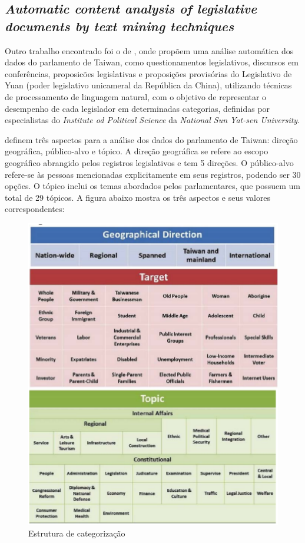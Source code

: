 \subsection{\textit{Automatic content analysis of legislative documents by text mining techniques}}

Outro trabalho encontrado foi o de , onde propõem uma análise automática dos dados do parlamento de Taiwan, como questionamentos legislativos, discursos em conferências, proposicões legislativas e proposições provisórias do Legislativo de Yuan (poder legislativo unicameral da República da China), utilizando técnicas de processamento de linguagem natural, com o objetivo de representar o desempenho de cada legislador em determinadas categorias, definidas por especialistas do \textit{Institute od Political Science} da \textit{National Sun Yat-sen University}.

 definem três aspectos para a análise dos dados do parlamento de Taiwan: direção geográfica, público-alvo e tópico. A direção geográfica se refere ao escopo geográfico abrangido pelos registros legislativos e tem 5 direções. O público-alvo refere-se às pessoas mencionadas explicitamente em seus registros, podendo ser 30 opções. O tópico inclui os temas abordados pelos parlamentares, que possuem um total de 29 tópicos. A figura abaixo mostra os três aspectos e seus valores correspondentes:

\clearpage

\begin{figure}[h]
    \centering
    \includegraphics[scale=0.5]{figuras/aspects.eps}
    \caption{Estrutura de categorização}
\end{figure}


